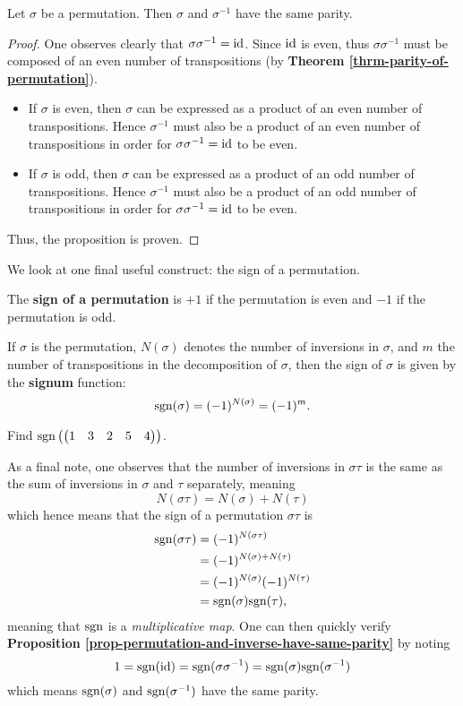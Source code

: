 \newpage

\begin{proposition}\label{prop-permutation-and-inverse-have-same-parity}
    Let $\sigma$ be a permutation. Then $\sigma$ and $\sigma^{-1}$ have the same parity.
\end{proposition}
\begin{proof}
    One observes clearly that $\sigma\sigma^{-1} = \mathrm{id}$. Since $\mathrm{id}$ is even, thus $\sigma\sigma^{-1}$ must be composed of an even number of transpositions (by \textbf{Theorem \ref{thrm-parity-of-permutation}}).
    \begin{itemize}
        \item If $\sigma$ is even, then $\sigma$ can be expressed as a product of an even number of transpositions. Hence $\sigma^{-1}$ must also be a product of an even number of transpositions in order for $\sigma\sigma^{-1} = \mathrm{id}$ to be even.
        \item If $\sigma$ is odd, then $\sigma$ can be expressed as a product of an odd number of transpositions. Hence $\sigma^{-1}$ must also be a product of an odd number of transpositions in order for $\sigma\sigma^{-1} = \mathrm{id}$ to be even.
    \end{itemize}
    Thus, the proposition is proven.
\end{proof}

We look at one final useful construct: the sign of a permutation.
\begin{definition}
    The \textbf{sign of a permutation} is $+1$ if the permutation is even and $-1$ if the permutation is odd.
\end{definition}
If $\sigma$ is the permutation, $N(\sigma)$ denotes the number of inversions in $\sigma$, and $m$ the number of transpositions in the decomposition of $\sigma$, then the sign of $\sigma$ is given by the \textbf{signum} function:
\[
    \mathrm{sgn}(\sigma) = (-1)^{N(\sigma)} = (-1)^m.
\]
\begin{exercise}
    Find $\mathrm{sgn}\left(\begin{pmatrix}1&3&2&5&4\end{pmatrix}\right)$.
\end{exercise}

As a final note, one observes that the number of inversions in $\sigma\tau$ is the same as the sum of inversions in $\sigma$ and $\tau$ separately, meaning
\[
    N(\sigma\tau) = N(\sigma) + N(\tau)
\]
which hence means that the sign of a permutation $\sigma\tau$ is
\begin{align*}
    \mathrm{sgn}(\sigma\tau) &= (-1)^{N(\sigma\tau)}\\
    &= (-1)^{N(\sigma) + N(\tau)}\\
    &= (-1)^{N(\sigma)}(-1)^{N(\tau)}\\
    &= \mathrm{sgn}(\sigma)\mathrm{sgn}(\tau),
\end{align*}
meaning that $\mathrm{sgn}$ is a \textit{multiplicative map}. One can then quickly verify \textbf{Proposition \ref{prop-permutation-and-inverse-have-same-parity}} by noting
\[
    1 = \mathrm{sgn}(\mathrm{id}) = \mathrm{sgn}(\sigma\sigma^{-1}) = \mathrm{sgn}(\sigma)\mathrm{sgn}(\sigma^{-1})
\]
which means $\mathrm{sgn}(\sigma)$ and $\mathrm{sgn}(\sigma^{-1})$ have the same parity.

